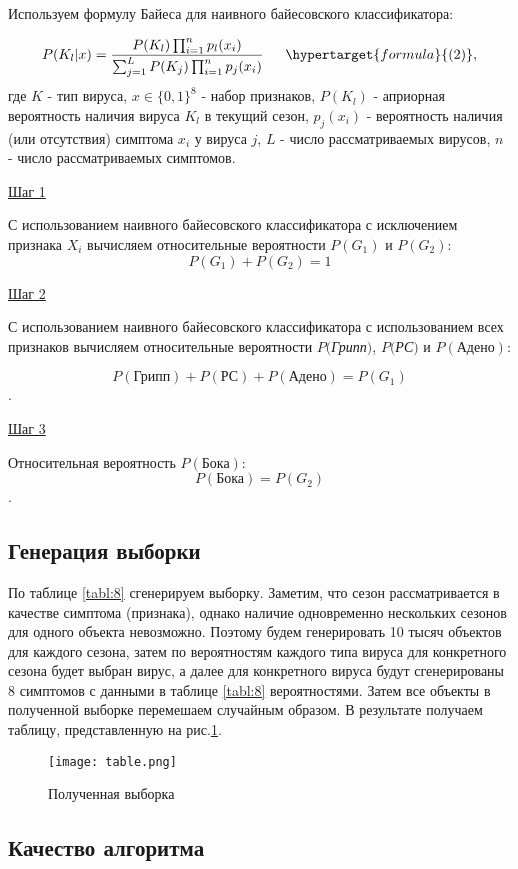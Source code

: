 \documentclass{article}
\begin{document}
Используем формулу Байеса для наивного байесовского классификатора:

$$P(K_l|x) = \frac{P(K_l)\prod_{i=1}^np_l(x_i)}{\sum_{j=1}^L P(K_j)\prod_{i=1}^n p_j(x_i)} \:\:\:\:\:\:\: \hypertarget{formula}{(2)},$$
где $K$ - тип вируса, $x \in \{0,1\}^8$ - набор признаков, $P(K_l)$ - априорная вероятность наличия вируса $K_l$ в текущий сезон, $p_j(x_i)$ - вероятность наличия (или отсутствия) симптома $x_i$ у вируса $j$, $L$ - число рассматриваемых вирусов, $n$ - число рассматриваемых симптомов.

\underline{Шаг 1}

С использованием наивного байесовского классификатора с исключением
признака $X_i$ 
вычисляем относительные вероятности $P(G_1)$ и $P(G_2)$: $$P(G_1) + P(G_2) = 1$$

\underline{Шаг 2}

С использованием наивного байесовского классификатора с использованием всех признаков вычисляем относительные вероятности $P($\textit{Грипп}$)$, $P($\textit{РС}$)$ и $ P(\textit{Адено}) $: 

$$P(\textit{Грипп}) + P(\textit{РС}) + P(\textit{Адено}) = P(G_1)$$.

\underline{Шаг 3}

Относительная вероятность $P(\textit{Бока})$: $$P(\textit{Бока}) = P(G_2)$$. \\

\subsection{Генерация выборки}

По таблице \ref{tabl:8} сгенерируем выборку. Заметим, что сезон рассматривается в качестве симптома (признака), однако наличие одновременно нескольких сезонов для одного объекта невозможно. Поэтому будем генерировать 10 тысяч объектов для каждого сезона, затем по вероятностям каждого типа вируса для конкретного сезона будет выбран вирус, а далее для конкретного вируса будут сгенерированы 8 симптомов с данными в таблице \ref{tabl:8} вероятностями. Затем все объекты в полученной выборке перемешаем случайным образом. В результате получаем таблицу, представленную на рис.\ref{fig:table}.

\begin{figure}[H]
    \centering
    \texttt{[image: table.png]}
    \caption{Полученная выборка}
    \label{fig:table}
\end{figure}

\subsection{Качество алгоритма}
\end{document}
